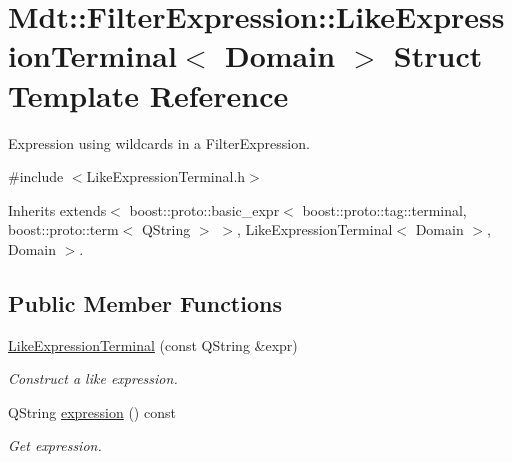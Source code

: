 \hypertarget{struct_mdt_1_1_filter_expression_1_1_like_expression_terminal}{}\section{Mdt\+:\+:Filter\+Expression\+:\+:Like\+Expression\+Terminal$<$ Domain $>$ Struct Template Reference}
\label{struct_mdt_1_1_filter_expression_1_1_like_expression_terminal}


Expression using wildcards in a Filter\+Expression.  




{\ttfamily \#include $<$Like\+Expression\+Terminal.\+h$>$}



Inherits extends$<$ boost\+::proto\+::basic\+\_\+expr$<$ boost\+::proto\+::tag\+::terminal, boost\+::proto\+::term$<$ Q\+String $>$ $>$, Like\+Expression\+Terminal$<$ Domain $>$, Domain $>$.

\subsection*{Public Member Functions}
\begin{DoxyCompactItemize}
\item 
\hyperlink{struct_mdt_1_1_filter_expression_1_1_like_expression_terminal_a75f77759b0b7105f1d7531dee40a9558}{Like\+Expression\+Terminal} (const Q\+String \&expr)\hypertarget{struct_mdt_1_1_filter_expression_1_1_like_expression_terminal_a75f77759b0b7105f1d7531dee40a9558}{}\label{struct_mdt_1_1_filter_expression_1_1_like_expression_terminal_a75f77759b0b7105f1d7531dee40a9558}

\begin{DoxyCompactList}\small\item\em Construct a like expression. \end{DoxyCompactList}\item 
Q\+String \hyperlink{struct_mdt_1_1_filter_expression_1_1_like_expression_terminal_a412c52c77b9901dc8fc1e59a42df568b}{expression} () const \hypertarget{struct_mdt_1_1_filter_expression_1_1_like_expression_terminal_a412c52c77b9901dc8fc1e59a42df568b}{}\label{struct_mdt_1_1_filter_expression_1_1_like_expression_terminal_a412c52c77b9901dc8fc1e59a42df568b}

\begin{DoxyCompactList}\small\item\em Get expression. \end{DoxyCompactList}\end{DoxyCompactItemize}



